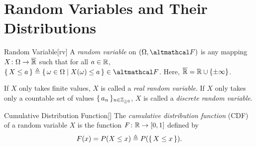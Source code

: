 \documentclass[../complex_variables_1.tex]{subfiles}
\begin{document}
\section{Random Variables and Their Distributions}

\begin{Definition}{Random Variable}[rv]
    A \emph{random variable} on \((\Omega, \mcal{F})\) is any mapping \(X \colon \Omega \to \ol{\RR}\)
    such that for all \(a \in \RR\), \(\{\,X \le a\,\} \triangleq \{\,\omega \in \Omega \mid
    X(\omega) \le a\,\} \in \mcal{F}\). Here, \(\ol{\RR} = \RR \cup \{\pm\infty\}\).

    \begin{itemize}
        \ii
        If \(X\) only takes finite values, \(X\) is called a
        \emph{real random variable}.
        \ii
        If \(X\) only takes only a countable set of values \(\{\,a_n\,\}_{n \in \ZZ_{\ge 0}}\),
        \(X\) is called a \emph{discrete random variable}.
    \end{itemize}
\end{Definition}

\begin{Definition}{Cumulative Distribution Function}[]
    The \emph{cumulative distribution function} (CDF) of a random variable \(X\) is the function
    \(F \colon \RR \to [0, 1]\) defined by
    \[
        F(x) = P(X \le x) \triangleq P(\{\,X \le x\,\})\text.
    \]
\end{Definition}
\end{document}
